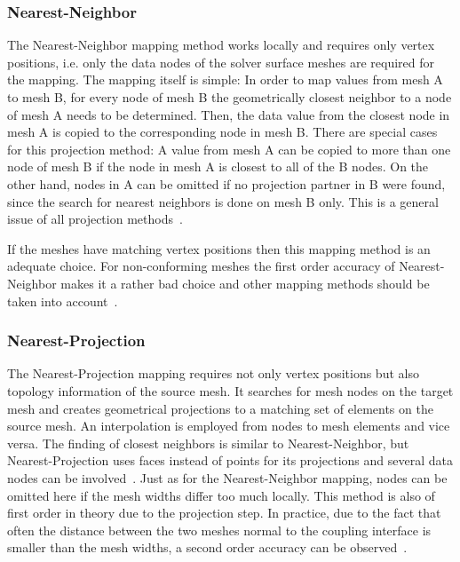   \subsubsection{Nearest-Neighbor}\label{sec:Coupl-DataMapping-NN}
   The Nearest-Neighbor mapping method works locally and requires only vertex positions, i.e. only the data nodes of the solver surface meshes are required for the mapping. The mapping itself is simple: In order to map values from mesh A to mesh B, for every node of mesh B the geometrically closest neighbor to a node of mesh A needs to be determined. Then, the data value from the closest node in mesh A is copied to the corresponding node in mesh B. There are special cases for this projection method: A value from mesh A can be copied to more than one node of mesh B if the node in mesh A is closest to all of the B nodes. On the other hand, nodes in A can be omitted if no projection partner in B were found, since the search for nearest neighbors is done on mesh B only. This is a general issue of all projection methods~\cite{gatzhammer2015efficient}.
   
   If the meshes have matching vertex positions then this mapping method is an adequate choice. For non-conforming meshes the first order accuracy of Nearest-Neighbor makes it a rather bad choice and other mapping methods should be taken into account~\cite{bungartz2015fully}.
  
  \subsubsection{Nearest-Projection}\label{sec:Coupl-DataMapping-NP}
   The Nearest-Projection mapping requires not only vertex positions but also topology information of the source mesh. It searches for mesh nodes on the target mesh and creates geometrical projections to a matching set of elements on the source mesh. An interpolation is employed from nodes to mesh elements and vice versa. The finding of closest neighbors is similar to Nearest-Neighbor, but Nearest-Projection uses faces instead of points for its projections and several data nodes can be involved~\cite{gatzhammer2015efficient}. Just as for the Nearest-Neighbor mapping, nodes can be omitted here if the mesh widths differ too much locally. This method is also of first order in theory due to the projection step. In practice, due to the fact that often the distance between the two meshes normal to the coupling interface is smaller than the mesh widths, a second order accuracy can be observed~\cite{bungartz2015fully}.
  

